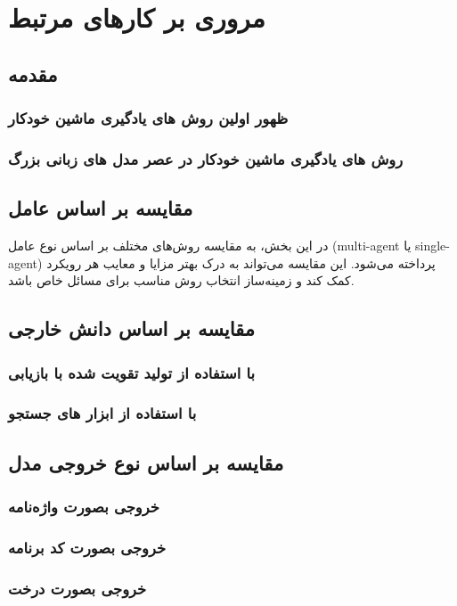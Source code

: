 \chapter{مروری بر کارهای مرتبط}
\thispagestyle{empty}

\section{مقدمه}
\subsection{ظهور اولین روش های یادگیری ماشین خودکار}
\subsection{روش های یادگیری ماشین خودکار در عصر مدل های زبانی بزرگ}

\section{مقایسه بر اساس عامل}
در این بخش، به مقایسه روش‌های مختلف بر اساس نوع عامل (multi-agent یا single-agent) پرداخته می‌شود. این مقایسه می‌تواند به درک بهتر مزایا و معایب هر رویکرد کمک کند و زمینه‌ساز انتخاب روش مناسب برای مسائل خاص باشد.

\section{مقایسه بر اساس دانش خارجی}
\subsection{با استفاده از تولید تقویت شده با بازیابی}
\subsection{با استفاده از ابزار های جستجو}
\section{مقایسه بر اساس نوع خروجی مدل}
\subsection{خروجی بصورت واژه‌نامه}
\subsection{خروجی بصورت کد برنامه}
\subsection{خروجی بصورت درخت}
